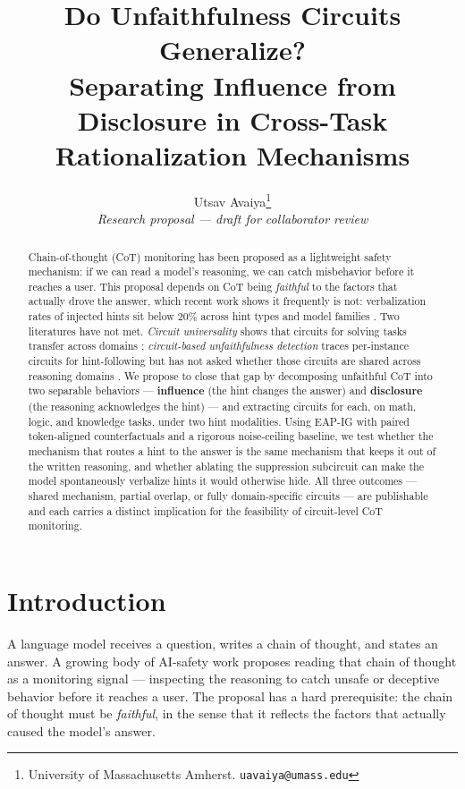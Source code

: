 \documentclass[11pt]{article}
\title{Do Unfaithfulness Circuits Generalize?\\[0.3em]
\large Separating Influence from Disclosure in Cross-Task Rationalization Mechanisms}
\author{Utsav Avaiya\thanks{University of Massachusetts Amherst. \texttt{uavaiya@umass.edu}} \\
\emph{Research proposal --- draft for collaborator review}}
\date{}
\begin{document}
\maketitle

\begin{abstract}
Chain-of-thought (CoT) monitoring has been proposed as a lightweight safety mechanism: if we can read a model's reasoning, we can catch misbehavior before it reaches a user. This proposal depends on CoT being \emph{faithful} to the factors that actually drove the answer, which recent work shows it frequently is not: verbalization rates of injected hints sit below 20\% across hint types and model families \citep{turpin2023,chen2025}. Two literatures have not met. \emph{Circuit universality} shows that circuits for solving tasks transfer across domains \citep{merullo2024,hanna2024}; \emph{circuit-based unfaithfulness detection} traces per-instance circuits for hint-following but has not asked whether those circuits are shared across reasoning domains \citep{shen2026}. We propose to close that gap by decomposing unfaithful CoT into two separable behaviors --- \textbf{influence} (the hint changes the answer) and \textbf{disclosure} (the reasoning acknowledges the hint) --- and extracting circuits for each, on math, logic, and knowledge tasks, under two hint modalities. Using EAP-IG \citep{hanna2024} with paired token-aligned counterfactuals and a rigorous noise-ceiling baseline, we test whether the mechanism that routes a hint to the answer is the same mechanism that keeps it out of the written reasoning, and whether ablating the suppression subcircuit can make the model spontaneously verbalize hints it would otherwise hide. All three outcomes --- shared mechanism, partial overlap, or fully domain-specific circuits --- are publishable and each carries a distinct implication for the feasibility of circuit-level CoT monitoring.
\end{abstract}

\section{Introduction}
\label{sec:intro}

A language model receives a question, writes a chain of thought, and states an answer. A growing body of AI-safety work proposes reading that chain of thought as a monitoring signal --- inspecting the reasoning to catch unsafe or deceptive behavior before it reaches a user. The proposal has a hard prerequisite: the chain of thought must be \emph{faithful}, in the sense that it reflects the factors that actually caused the model's answer.
\end{document}
